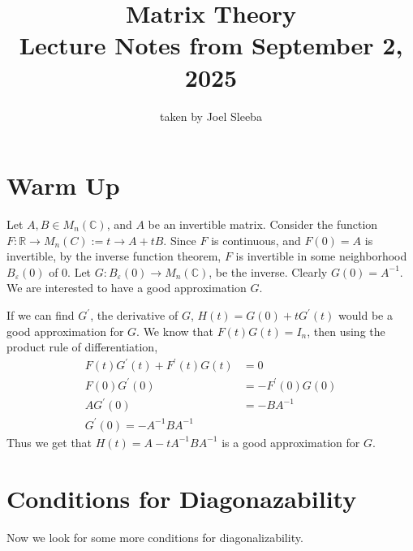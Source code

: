 \documentclass[11pt]{article}
\theoremstyle{plain} %
\theoremstyle{definition} %
\theoremstyle{remark} %
\begin{document}
\title{Matrix Theory\\ Lecture Notes from September 2, 2025}
\date{}
\author{
  taken by Joel Sleeba
}

\maketitle

\section{Warm Up}
Let $A, B \in M_n(\mathbb{C})$, and $A$ be an invertible matrix.
Consider the function $F: \mathbb{R} \to M_n(C) := t \to A + tB$.
Since $F$ is continuous, and $F(0) = A$ is invertible, by the inverse
function theorem, $F$ is invertible in some neighborhood
$B_\varepsilon(0)$ of $0$. Let $G: B_\varepsilon(0) \to
M_n(\mathbb{C})$, be the inverse. Clearly $G(0) = A^{-1}$. We are
interested to have a good approximation $G$.

If we can find $G^\prime$, the derivative of $G$, $H(t) = G(0) + t
G^\prime(t)$ would be a good approximation for $G$. We know that
$F(t)G(t) = I_n$, then using the product rule of differentiation,
\begin{align*}
  F(t) G^\prime(t) + F^\prime(t) G(t) &= 0 \\
  F(0) G^\prime(0) &= - F^\prime(0)G(0) \\
  A G^\prime(0) &= -BA^{-1} \\
  G^\prime(0) = -A^{-1}BA^{-1}
\end{align*}
Thus we get that $H(t) = A - t A^{-1}BA^{-1}$ is a good approximation for $G$.

\section{Conditions for Diagonazability}

Now we look for some more conditions for diagonalizability.
\end{document}
